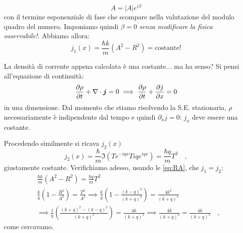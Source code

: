 \[
    A = |A|e^{i\beta}
\]
con il termine esponenziale di fase che scompare nella valutazione del modulo quadro del numero. Imponiamo quindi $\beta = 0$ \emph{senza modificare la fisica osservabile!}. Abbiamo allora:
\[
    j_1(x) = \frac{\hbar k}{m}(A^2-R^2) = \text{costante!} 
\]
\begin{approfondimento}[title={Densità di corrente di probabilità costante}]
    \noindent
    La densità di corrente appena calcolata è una costante... ma ha senso? 
Si pensi all'equazione di continuità:
\[
    \pdv{\rho}{t} + \nabla \cdot \bm{j} = 0 \implies \pdv{\rho}{t} +  \pdv{j}{x} = 0
\]
in una dimensione. Dal momento che stiamo risolvendo la S.E. stazionaria, $\rho$ necessariamente è indipendente dal tempo e quindi $\partial_x j = 0$: $j_x$ deve essere una costante.
\end{approfondimento}

\noindent
Procedendo similmente si ricava $j_2(x)$
\[
    j_2(x) = \frac{\hbar}{m} \Im\left( Te^{-iqx}Tiqe^{iqx} \right) = \frac{\hbar q}{m}T^2 \quad,
\]
giustamente costante. Verifichiamo adesso, usando le \eqref{eq:RA}, che $j_1 = j_2$:
\[
\begin{aligned}
    &\frac{\hbar k}{m}(A^2-R^2) = \frac{\hbar q}{m}T^2 \\
    &\frac{k}{q}\left( 1-\frac{R^2}{A^2} \right) = \frac{T^2}{A^2} \implies \frac{k}{q}\left( 1-\frac{(k-q)^2}{(k+q)^2} \right) = \frac{4k^2}{(k+q)^2} \\ &\implies \frac{1}{q}\left( \frac{(k+q)^2-(k-q)^2}{(k+q)^2} \right) = \frac{4k}{(k+q)^2} \implies \frac{4k}{(k+q)^2} = \frac{4k}{(k+q)^2} \quad,
\end{aligned}
\] 
come cercavamo.


